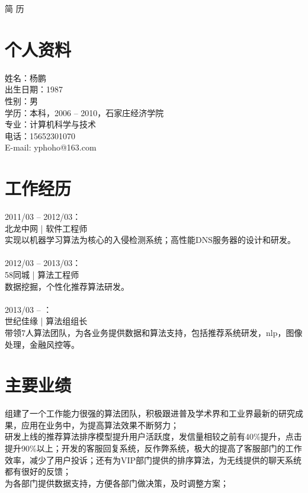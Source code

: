 \documentclass[11pt, a4paper]{article}
\begin{document}
\begin{center}
    \Huge{简{ }{ }历}       %
\end{center}





\section*{个人资料}         %

姓名：杨鹏 \\
出生日期：1987 \\
性别：男 \\
学历：本科，2006 -- 2010，石家庄经济学院 \\
专业：计算机科学与技术 \\
电话：\mbox{15652301070} \\
E-mail: yphoho@163.com \\






\section*{工作经历}

2011/03 -- 2012/03： \\
北龙中网 | 软件工程师 \\
实现以机器学习算法为核心的入侵检测系统；高性能DNS服务器的设计和研发。 \\
\\
2012/03 -- 2013/03： \\
58同城 | 算法工程师 \\
数据挖掘，个性化推荐算法研发。 \\
\\
2013/03 -- ： \\
世纪佳缘 | 算法组组长 \\
带领7人算法团队，为各业务提供数据和算法支持，包括推荐系统研发，nlp，图像处理，金融风控等。 \\





\section*{主要业绩}

组建了一个工作能力很强的算法团队，积极跟进普及学术界和工业界最新的研究成果，应用在业务中，为提高算法效果不断努力； \\
研发上线的推荐算法排序模型提升用户活跃度，发信量相较之前有40\%提升，点击提升90\%以上；开发的客服回复系统，反作弊系统，极大的提高了客服部门的工作效率，减少了用户投诉；还有为VIP部门提供的排序算法，为无线提供的聊天系统都有很好的反馈； \\
为各部门提供数据支持，方便各部门做决策，及时调整方案； \\
\end{document}
